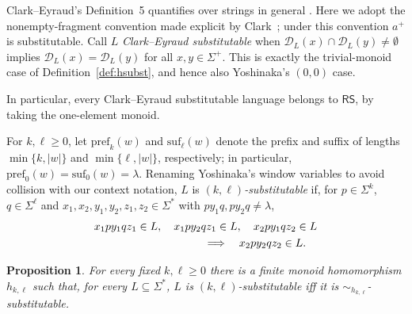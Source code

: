 \documentclass[11pt,a4paper]{article}
\newtheorem{proposition}[theorem]{Proposition}
\theoremstyle{remark}
\theoremstyle{plain}
\newcommand{\D}{\mathcal{D}}
\newcommand{\pref}{\mathrm{pref}}
\newcommand{\suf}{\mathrm{suf}}
\begin{document}
Clark--Eyraud's Definition~5 quantifies over strings in general
\cite{clark-eyraud2007}.  Here we adopt the nonempty-fragment convention made
explicit by Clark~\cite{clark2013}; under this convention $a^+$ is
substitutable.  Call $L$
\emph{Clark--Eyraud substitutable} when
$\D_L(x)\cap\D_L(y)\ne\emptyset$ implies
$\D_L(x)=\D_L(y)$ for all $x,y\in\Sigma^+$.  This is exactly the
trivial-monoid case of Definition~\ref{def:hsubst}, and hence also
Yoshinaka's $(0,0)$ case.

In particular, every Clark--Eyraud substitutable language belongs to
$\mathsf{RS}$, by taking the one-element monoid.

For $k,\ell\ge0$, let $\pref_k(w)$ and $\suf_\ell(w)$ denote the
prefix and suffix of lengths $\min\{k,|w|\}$ and
$\min\{\ell,|w|\}$, respectively; in particular,
$\pref_0(w)=\suf_0(w)=\lambda$.  Renaming Yoshinaka's window variables to
avoid collision with our context notation, $L$ is
\emph{$(k,\ell)$-substitutable} if, for
$p\in\Sigma^k$, $q\in\Sigma^\ell$ and
$x_1,x_2,y_1,y_2,z_1,z_2\in\Sigma^*$ with
$py_1q,py_2q\ne\lambda$,
\[
\begin{split}
&x_1py_1qz_1\in L,\quad x_1py_2qz_1\in L,\quad
x_2py_1qz_2\in L\\
&\hspace{35mm}\Longrightarrow\quad x_2py_2qz_2\in L.
\end{split}
\]

\begin{proposition}\label{prop:yl-special}
For every fixed $k,\ell\ge0$ there is a finite monoid homomorphism
$h_{k,\ell}$ such that, for every $L\subseteq\Sigma^*$,
$L$ is $(k,\ell)$-substitutable iff it is
$\sim_{h_{k,\ell}}$-substitutable.
\end{proposition}
\end{document}
